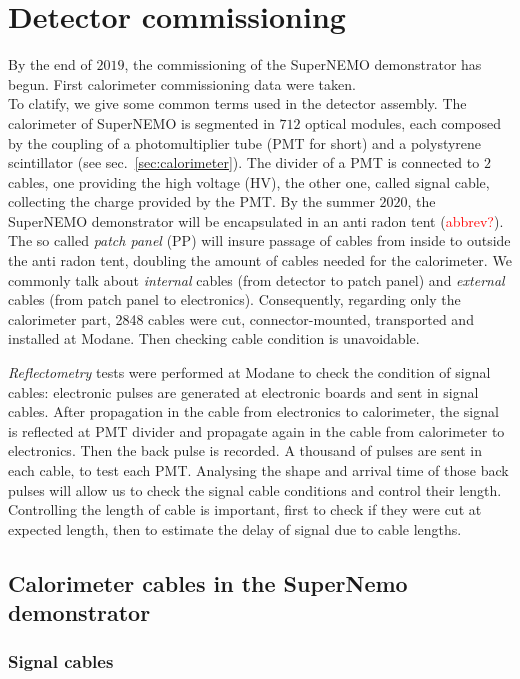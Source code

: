 \chapter{Detector commissioning}
\label{sec:commissioning}

By the end of $2019$, the commissioning of the SuperNEMO demonstrator has begun.
First calorimeter commissioning data were taken.\\
To clatify, we give some common terms used in the detector assembly.
The calorimeter of SuperNEMO is segmented in $712$ optical modules, each composed by the coupling of a photomultiplier tube (PMT for short) and a polystyrene scintillator (see sec.~\ref{sec:calorimeter}).
The divider of a PMT is connected to $2$ cables, one providing the high voltage (HV), the other one, called signal cable, collecting the charge provided by the PMT.
By the summer $2020$, the SuperNEMO demonstrator will be encapsulated in an anti radon tent (\textcolor{red}{abbrev?}).
The so called \emph{patch panel} (PP) will insure passage of cables from inside to outside the anti radon tent, doubling the amount of cables needed for the calorimeter.
We commonly talk about \emph{internal} cables (from detector to patch panel) and \emph{external} cables (from patch panel to electronics).
Consequently, regarding only the calorimeter part, 2848 cables were cut, connector-mounted, transported and installed at Modane.
Then checking cable condition is unavoidable.

\emph{Reflectometry} tests were performed at Modane to check the condition of signal cables:
electronic pulses are generated at electronic boards and sent in signal cables.
After propagation in the cable from electronics to calorimeter, the signal is reflected at PMT divider and propagate again in the cable from calorimeter to electronics.
Then the back pulse is recorded.
A thousand of pulses are sent in each cable, to test each PMT.
Analysing the shape and arrival time of those back pulses will allow us to check the signal cable conditions and control their length.
Controlling the length of cable is important, first to check if they were cut at expected length, then to estimate the delay of signal due to cable lengths.


\section{Calorimeter cables in the SuperNemo demonstrator}
\subsection{Signal cables}
